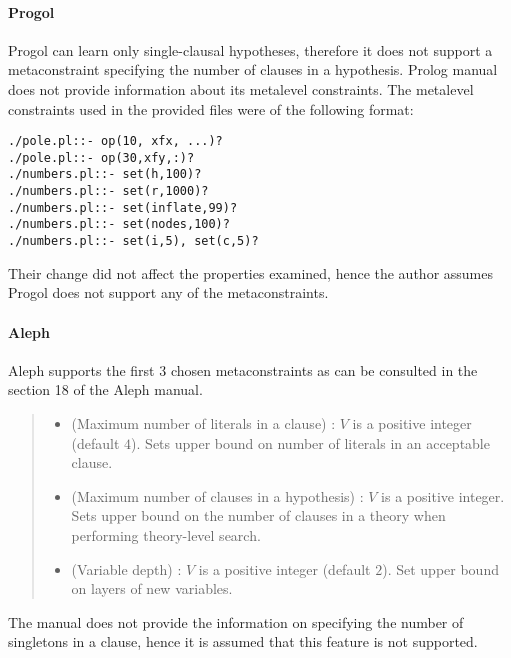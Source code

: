 \paragraph{Progol}
Progol can learn only single-clausal hypotheses\cite{muggleton2012mc}, therefore it does not support a metaconstraint specifying the number of clauses in a hypothesis.
Prolog manual does not provide information about its metalevel constraints. The metalevel constraints used in the provided files\cite{muggleton1999progolWebsite} were of the following format:
\begin{lstlisting}
./pole.pl::- op(10, xfx, ...)?
./pole.pl::- op(30,xfy,:)?
./numbers.pl::- set(h,100)?
./numbers.pl::- set(r,1000)?
./numbers.pl::- set(inflate,99)?
./numbers.pl::- set(nodes,100)?
./numbers.pl::- set(i,5), set(c,5)?
\end{lstlisting}
Their change did not affect the properties examined, hence the author assumes Progol does not support any of the metaconstraints.

\paragraph{Aleph}
Aleph supports the first 3 chosen metaconstraints as can be consulted in the section 18 of the Aleph manual\cite{aleph2007}.
\begin{quote}
\begin{itemize}
\item (Maximum number of literals in a clause) :
$V$ is a positive integer (default $4$). Sets upper bound on number of literals in an acceptable clause.
\item (Maximum number of clauses in a hypothesis) :
$V$ is a positive integer. Sets upper bound on the number of clauses in a theory  when performing theory-level search.
\item (Variable depth) : $V$ is a positive integer (default $2$). Set upper bound on layers of new variables.
\end{itemize}
\end{quote}

The manual does not provide the information on specifying the number of singletons in a clause, hence it is assumed that this feature is not supported.

